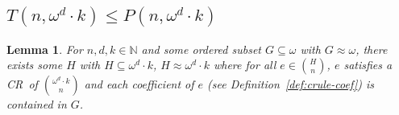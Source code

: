 \documentclass[10pt,a4paper]{article}
\newcommand{\om}{\omega}
\newcommand{\oequiv}{\approx}
\newcommand{\N}{\mathbb{N}}
\newcommand{\crulenospace}{CR}
\newcommand{\crule}{\crulenospace~}
\newcommand{\numpoints}{n}
\theoremstyle{plain}
\newtheorem{lemma}[theorem]{Lemma}
\theoremstyle{definition}
\begin{document}
\subsection{\texorpdfstring{$T(\numpoints,\om^d \cdot k) \leq P(\numpoints,\om^d \cdot k)$}{T(\numpoints, omega d k) <= P(\numpoints, omega d k)}}

\begin{lemma}
\label{le:bend-nats-k}
For $\numpoints,d,k \in \N$ and some ordered subset $G \subseteq \om$ with
$G \oequiv \om$, there exists some $H$ with $H \subseteq \om^d \cdot k$, $H \oequiv \om^d \cdot k$ where for all $e \in \binom{H}{\numpoints}$, $e$ satisfies a \crule of $\binom{\om^d \cdot k}{\numpoints}$ and each coefficient of $e$ (see Definition~\ref{def:crule-coef})
is contained in $G$.
\end{lemma}
\end{document}
